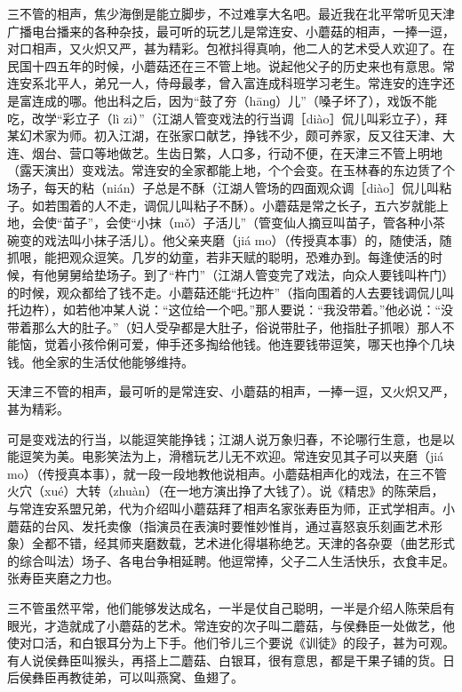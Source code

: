 \documentclass[12pt,UTF8]{ctexbook}
\begin{document}
三不管的相声，焦少海倒是能立脚步，不过难享大名吧。最近我在北平常听见天津广播电台播来的各种杂技，最可听的玩艺儿是常连安、小蘑菇的相声，一捧一逗，对口相声，又火炽又严，甚为精彩。包袱抖得真响，他二人的艺术受人欢迎了。在民国十四五年的时候，小蘑菇还在三不管上地。说起他父子的历史来也有意思。常连安系北平人，弟兄一人，侍母最孝，曾入富连成科班学习老生。常连安的连字还是富连成的哪。他出科之后，因为“鼓了夯（hānɡ）儿”（嗓子坏了），戏饭不能吃，改学“彩立子（lì zi）”（江湖人管变戏法的行当调［diào］侃儿叫彩立子），拜某幻术家为师。初入江湖，在张家口献艺，挣钱不少，颇可养家，反又往天津、大连、烟台、营口等地做艺。生齿日繁，人口多，行动不便，在天津三不管上明地（露天演出）变戏法。常连安的全家都能上地，个个会变。在玉林春的东边赁了个场子，每天的粘（nián）子总是不酥（江湖人管场的四面观众调［diào］侃儿叫粘子。如若围着的人不走，调侃儿叫粘子不酥）。小蘑菇是常之长子，五六岁就能上地，会使“苗子”，会使“小抹（mǒ）子活儿”（管变仙人摘豆叫苗子，管各种小茶碗变的戏法叫小抹子活儿）。他父亲夹磨（jiá mo）（传授真本事）的，随使活，随抓哏，能把观众逗笑。几岁的幼童，若非天赋的聪明，恐难办到。每逢使活的时候，有他舅舅给垫场子。到了“杵门”（江湖人管变完了戏法，向众人要钱叫杵门）的时候，观众都给了钱不走。小蘑菇还能“托边杵”（指向围着的人去要钱调侃儿叫托边杵），如若他冲某人说：“这位给一个吧。”那人要说：“我没带着。”他必说：“没带着那么大的肚子。”（妇人受孕都是大肚子，俗说带肚子，他指肚子抓哏）那人不能恼，觉着小孩伶俐可爱，伸手还多掏给他钱。他连要钱带逗笑，哪天也挣个几块钱。他全家的生活仗他能够维持。

天津三不管的相声，最可听的是常连安、小蘑菇的相声，一捧一逗，又火炽又严，甚为精彩。



可是变戏法的行当，以能逗笑能挣钱；江湖人说万象归春，不论哪行生意，也是以能逗笑为美。电影笑法为上，滑稽玩艺儿无不欢迎。常连安见其子可以夹磨（jiá mo）（传授真本事），就一段一段地教他说相声。小蘑菇相声化的戏法，在三不管火穴（xué）大转（zhuàn）（在一地方演出挣了大钱了）。说《精忠》的陈荣启，与常连安系盟兄弟，代为介绍叫小蘑菇拜了相声名家张寿臣为师，正式学相声。小蘑菇的台风、发托卖像（指演员在表演时要惟妙惟肖，通过喜怒哀乐刻画艺术形象）全都不错，经其师夹磨数载，艺术进化得堪称绝艺。天津的各杂耍（曲艺形式的综合叫法）场子、各电台争相延聘。他逗常捧，父子二人生活快乐，衣食丰足。张寿臣夹磨之力也。

三不管虽然平常，他们能够发达成名，一半是仗自己聪明，一半是介绍人陈荣启有眼光，才造就成了小蘑菇的艺术。常连安的次子叫二蘑菇，与侯彝臣一处做艺，他使对口活，和白银耳分为上下手。他们爷儿三个要说《训徒》的段子，甚为可观。有人说侯彝臣叫猴头，再搭上二蘑菇、白银耳，很有意思，都是干果子铺的货。日后侯彝臣再教徒弟，可以叫燕窝、鱼翅了。
\end{document}
